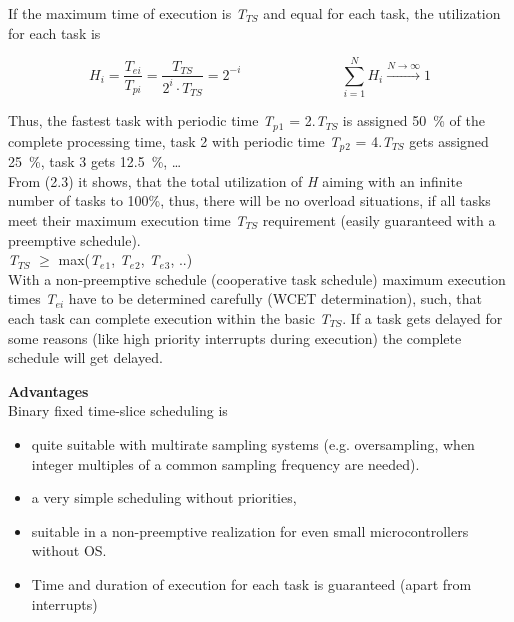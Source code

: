 If the maximum time of execution is \textit{T}${}_{TS}$ and equal for each task, the utilization for each task is 

\begin{equation}
	 H_{i} =\frac{T_{ei} }{T_{pi} } =\frac{T_{TS} }{2^{i} \cdot T_{TS} } =2^{-i} \hspace{3cm} \sum_{i=1}^N H_{i} \stackrel{N\to \infty }{\longrightarrow} 1
\label{EQ }
\end{equation}

Thus, the fastest task with periodic time \textit{T${}_{p}$}${}_{1}$ = 2$.$\textit{T}${}_{TS}$ is assigned 50~\% of the complete processing time, task 2 with periodic time \textit{T${}_{p}$}${}_{2}$ = 4$.$\textit{T}${}_{TS}$ gets assigned 25~\%, task 3 gets 12.5~\%, {\dots}\\

From (2.3) it shows, that the total utilization of \textit{H} aiming with an infinite number of tasks to 100\%, thus, there will be no overload situations, if all tasks meet their maximum execution time \textit{T${}_{TS}$} requirement (easily guaranteed with a preemptive schedule).\\

\textit{   T${}_{TS}$} $\mathrm{\ge}$ max(\textit{T${}_{e}$}${}_{1}$,\textit{ T${}_{e}$}${}_{2}$,\textit{ T${}_{e}$}${}_{3}$, ..)\\

With a non-preemptive schedule (cooperative task schedule) maximum execution times \textit{T${}_{ei}$} have to be determined carefully (WCET determination), such, that each task can complete execution within the basic \textit{T${}_{TS}$}. If a task gets delayed for some reasons (like high priority interrupts during execution) the complete schedule will get delayed.\\
\os{\newpage}
\nsl{\newpage}

\textbf{Advantages }\\

Binary fixed time-slice scheduling is

\begin{itemize}
	\item  quite suitable with multirate sampling systems (e.g. oversampling, when integer multiples of a common sampling frequency are needed).
	\item  a very simple scheduling without priorities,
	\item  suitable in a non-preemptive realization for even small microcontrollers without OS. 
	\item  Time and duration of execution for each task is guaranteed (apart from interrupts)
\end{itemize}


